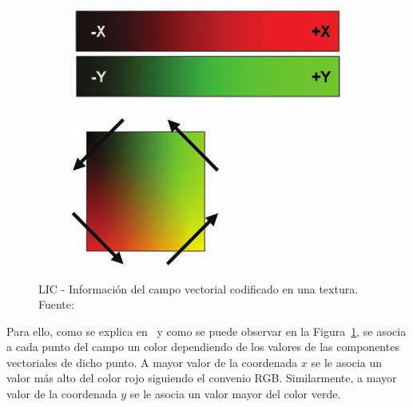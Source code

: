 \begin{figure}[b]
	\centering	
	\begin{subfigure}{0.7\textwidth}
			\includegraphics[width=\textwidth]{figures/lictexture2.png}	
	\end{subfigure}
	\begin{subfigure}{0.28\textwidth}
			\includegraphics[width=\textwidth]{figures/lictexture.png}	
	\end{subfigure}
	\caption[LIC - Información del campo vectorial codificado en una
	textura.]{LIC - Información del campo vectorial codificado en una textura.
	Fuente:~\cite{Bailey}}
	\label{fig:lictexture}
\end{figure}

Para ello, como se explica en~\citet{Bailey} y como se puede observar en la
Figura~\ref{fig:lictexture}, se asocia a cada punto del campo un color
dependiendo de los valores de las componentes vectoriales de dicho punto. A
mayor valor de la coordenada $x$ se le asocia un valor más alto del color rojo
siguiendo el convenio RGB. Similarmente, a mayor valor de la coordenada $y$ se
le asocia un valor mayor del color verde. 

